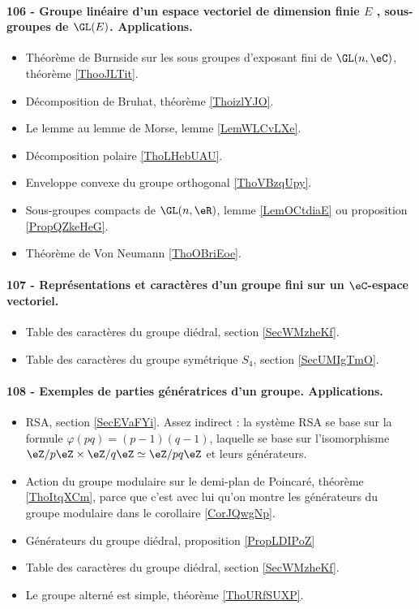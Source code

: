 \paragraph{106 - Groupe linéaire d’un espace vectoriel de dimension finie $E$ , sous-groupes de $\GL(E)$. Applications.}
\begin{itemize}
    \item Théorème de Burnside sur les sous groupes d'exposant fini de \( \GL(n,\eC)\), théorème \ref{ThooJLTit}.
    \item Décomposition de Bruhat, théorème \ref{ThoizlYJO}.
    \item Le lemme au lemme de Morse, lemme \ref{LemWLCvLXe}.
    \item Décomposition polaire \ref{ThoLHebUAU}.
    \item Enveloppe convexe du groupe orthogonal \ref{ThoVBzqUpy}.
    \item Sous-groupes compacts de \( \GL(n,\eR)\), lemme \ref{LemOCtdiaE} ou proposition \ref{PropQZkeHeG}.
    \item Théorème de Von Neumann \ref{ThoOBriEoe}.
\end{itemize}
\paragraph{107 - Représentations et caractères d’un groupe fini sur un \( \eC\)-espace vectoriel.}
\begin{itemize}
    \item Table des caractères du groupe diédral, section \ref{SecWMzheKf}.
    \item Table des caractères du groupe symétrique \( S_4\), section \ref{SecUMIgTmO}.
\end{itemize}
\paragraph{108 - Exemples de parties génératrices d’un groupe. Applications.}
\begin{itemize}
    \item RSA, section \ref{SecEVaFYi}. Assez indirect : la système RSA se base sur la formule \( \varphi(pq)=(p-1)(q-1)\), laquelle se base sur l'isomorphisme \( \eZ/p\eZ\times \eZ/q\eZ\simeq \eZ/pq\eZ\) et leurs générateurs.
    \item Action du groupe modulaire sur le demi-plan de Poincaré, théorème \ref{ThoItqXCm}, parce que c'est avec lui qu'on montre les générateurs du groupe modulaire dans le corollaire \ref{CorJQwgNp}.
    \item Générateurs du groupe diédral, proposition \ref{PropLDIPoZ}
    \item Table des caractères du groupe diédral, section \ref{SecWMzheKf}.
    \item Le groupe alterné est simple, théorème \ref{ThoURfSUXP}.
\end{itemize}

